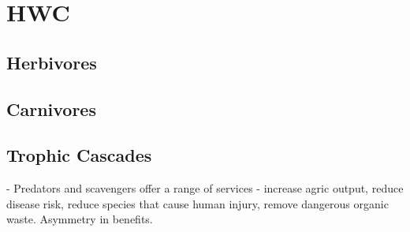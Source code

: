\section{HWC}

\subsection{Herbivores}

\subsection{Carnivores}

\subsection{Trophic Cascades}

\cite{O_Bryan_2018} - Predators and scavengers offer a range of services - increase agric output, reduce disease risk, reduce species that cause human injury, remove dangerous organic waste. Asymmetry in benefits.


